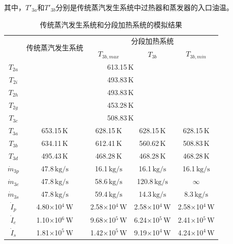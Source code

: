 其中，$T'_{3a}$和$T'_{3b}$分别是传统蒸汽发生系统中过热器和蒸发器的入口油温。
\begin{table}[htbp]
	\caption{传统蒸汽发生系统和分段加热系统的模拟结果}
	\begin{center}
	\begin{tabular}{ccccc}
		\toprule
		& \multirow{2}{*}{传统蒸汽发生系统} & \multicolumn{3}{c}{分段加热系统}\\\cline{3-5}
 &  & $T_{3b,max}$ & $T_{3b}$ & $T_{3b,min}$\\
		\midrule
		$T_{2a}$ & \multicolumn{4}{c}{613.15$\,\mathrm{K}$}\\
		$T_{2i}$ & \multicolumn{4}{c}{493.83$\,\mathrm{K}$}\\
		$T_{2h}$ & \multicolumn{4}{c}{493.83$\,\mathrm{K}$}\\
		$T_{2g}$ & \multicolumn{4}{c}{453.28$\,\mathrm{K}$}\\
		$T_{3c}$ & \multicolumn{4}{c}{508.83$\,\mathrm{K}$}\\
		$T_{3a}$	&	653.15$\,\mathrm{K}$
	&	628.15$\,\mathrm{K}$	&	628.15$\,\mathrm{K}$	&	628.15$\,\mathrm{K}$\\
		$T_{3b}$	&	634.11$\,\mathrm{K}$	&	612.41$\,\mathrm{K}$	&	560.62$\,\mathrm{K}$	&	508.83$\,\mathrm{K}$\\
		$T_{3d}$	&	495.43$\,\mathrm{K}$
	&	468.28$\,\mathrm{K}$	&	468.28$\,\mathrm{K}$	&	468.28$\,\mathrm{K}$\\
		$\dot{m}_{3p}$	&	47.8$\,\mathrm{kg/s}$	&	16.1$\,\mathrm{kg/s}$	&	16.1$\,\mathrm{kg/s}$	&	16.1$\,\mathrm{kg/s}$\\
		$\dot{m}_{3e}$	&	47.8$\,\mathrm{kg/s}$	&	58.6$\,\mathrm{kg/s}$	&	120.8$\,\mathrm{kg/s}$	&	$\infty$\\
		$\dot{m}_{3s}$	&	47.8$\,\mathrm{kg/s}$	&	59.4$\,\mathrm{kg/s}$	&	14.3$\,\mathrm{kg/s}$	&	8.3$\,\mathrm{kg/s}$\\
		$\dot{I}_p$    &    4.80$\times$10$^4\,\mathrm{W}$    	&  2.58$\times$10$^4\,\mathrm{W}$  &	2.58$\times$10$^4\,\mathrm{W}$	&	2.58$\times$10$^4\,\mathrm{W}$\\
		$\dot{I}_e$    &    1.10$\times$10$^6\,\mathrm{W}$    	&  9.68$\times$10$^5\,\mathrm{W}$  &	6.24$\times$10$^5\,\mathrm{W}$	&	2.41$\times$10$^5\,\mathrm{W}$	\\
		$\dot{I}_s$    &    1.81$\times$10$^5\,\mathrm{W}$    	&  1.42$\times$10$^5\,\mathrm{W}$  &	9.19$\times$10$^4\,\mathrm{W}$	&	4.24$\times$10$^4\,\mathrm{W}$\\

\end{tabular}
\end{center}
\end{table}
